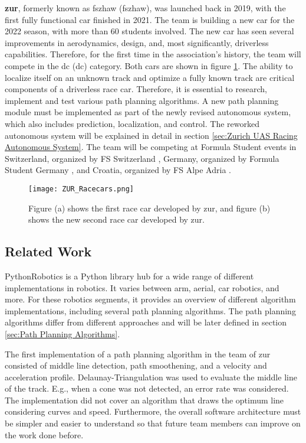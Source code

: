 \textbf{\acrlong{zur}}, formerly known as \acrlong{fszhaw} (\acrshort{fszhaw}), was launched back in 2019, with the first fully functional car finished in 2021. The team is building a new car for the 2022 season, with more than 60 students involved. The new car has seen several improvements in aerodynamics, design, and, most significantly, driverless capabilities. \cite{fszhaw_launch}
Therefore, for the first time in the association's history, the team will compete in the \acrlong{dc} (\acrshort{dc}) category. Both cars are shown in figure \ref{fig:ZUR Racecars}.
The ability to localize itself on an unknown track and optimize a fully known track are critical components of a driverless race car. Therefore, it is essential to research, implement and test various path planning algorithms. A new path planning module must be implemented as part of the newly revised autonomous system, which also includes prediction, localization, and control. The reworked autonomous system will be explained in detail in section \ref{sec:Zurich UAS Racing Autonomous System}.
The team will be competing at Formula Student events in Switzerland, organized by FS Switzerland \cite{fsswitzerland}, Germany, organized by Formula Student Germany \cite{fs_germany}, and Croatia, organized by FS Alpe Adria \cite{fs_alpe_adria}.
\begin{figure}[H]
    \centering
    \texttt{[image: ZUR\_Racecars.png]}
    \caption{Figure (a) shows the first race car developed by \acrshort{zur}, and figure (b) shows the new second race car developed by \acrshort{zur}.}
    \label{fig:ZUR Racecars}
\end{figure}

\subsection{Related Work} \label{sec:Related Work}
PythonRobotics is a Python library hub for a wide range of different implementations in robotics. It varies between arm, aerial, car robotics, and more.
For these robotics segments, it provides an overview of different algorithm implementations, including several path planning algorithms. \cite{python_robotics}
The path planning algorithms differ from different approaches and will be later defined in section \ref{sec:Path Planning Algorithms}.

The first implementation of a path planning algorithm in the team of \acrshort{zur} consisted of middle line detection, path smoothening, and a velocity and acceleration profile. Delaunay-Triangulation was used to evaluate the middle line of the track. E.g., when a cone was not detected, an error rate was considered. The implementation did not cover an algorithm that draws the optimum line considering curves and speed. Furthermore, the overall software architecture must be simpler and easier to understand so that future team members can improve on the work done before. \cite{autopilot_for_formula_student_jerome}

